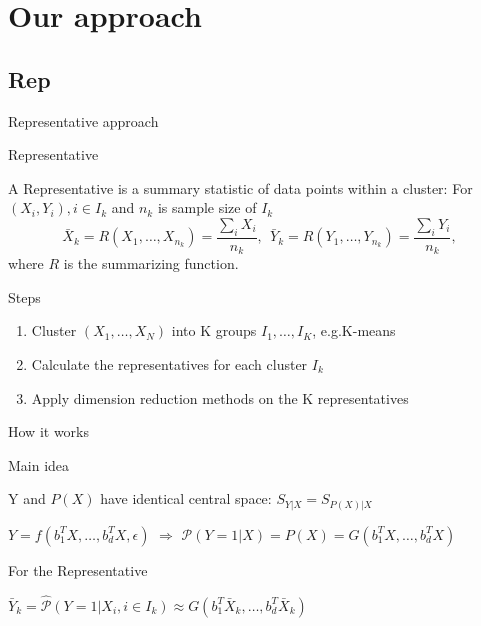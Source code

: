 \documentclass[ignorenonframetext,]{beamer}
\providecommand{\tightlist}{%
  \setlength{\itemsep}{0pt}\setlength{\parskip}{0pt}}
\begin{document}
\section{Our approach}\label{our-approach}

\subsection{Rep}\label{rep}

\begin{frame}{Representative approach}

\begin{block}{Representative}

A Representative is a summary statistic of data points within a cluster:
For \((X_i, Y_i), i \in I_k\) and \(n_k\) is sample size of \(I_k\) \[
  \bar{X}_k = R(X_{1}, \dots, X_{n_k}) = \frac{\sum_i X_i}{n_k},~~ \bar{Y}_k = R(Y_{1}, \dots, Y_{n_k}) = \frac{\sum_i Y_i}{n_k},
\] where \(R\) is the summarizing function.

\end{block}

\begin{block}{Steps}

\begin{enumerate}
\def\labelenumi{\arabic{enumi}.}
\tightlist
\item
  Cluster \((X_1, \dots,X_N)\) into K groups \(I_1, \dots, I_K\),
  e.g.K-means
\item
  Calculate the representatives for each cluster \(I_k\)
\item
  Apply dimension reduction methods on the K representatives
\end{enumerate}

\end{block}

\end{frame}

\begin{frame}{How it works}

\begin{block}{Main idea}

Y and \(P(X)\) have identical central space: \(S_{Y|X} = S_{P(X)|X}\)

\begin{center}
$Y = f(b_1^TX, \dots, b_d^TX,\epsilon)$
$\Rightarrow$
$\mathcal{P}(Y = 1 |X) = P(X) = G(b_1^TX, \dots, b_d^TX)$
\end{center}

\end{block}

\begin{block}{For the Representative}

\begin{center}
$\bar{Y}_k = \hat{\mathcal{P}}(Y = 1|X_i, i\in I_k) \approx G(b_1^T\bar{X}_k, \dots, b_d^T\bar{X}_k)$
\end{center}

\end{block}

\end{frame}
\end{document}
